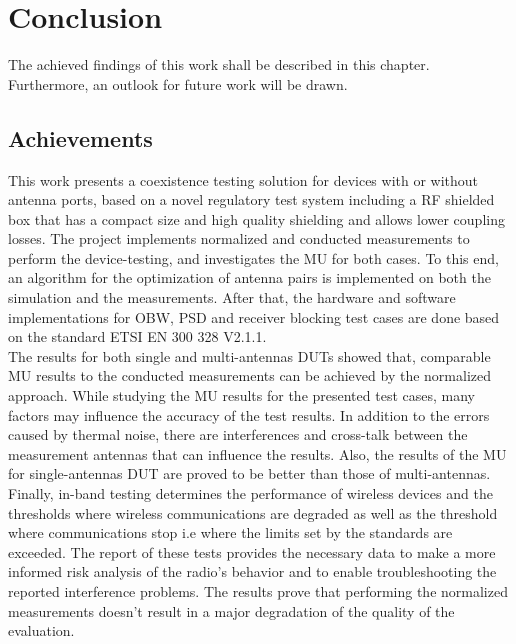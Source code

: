 \chapter{Conclusion} \label{chap:8}

The achieved findings of this work shall be described in this chapter. Furthermore, an outlook for future work will be drawn.

\section{Achievements}
This work presents a coexistence testing solution for devices with or without antenna ports, based on a novel regulatory test system including a \acs{RF} shielded box that has a compact size and high quality shielding and allows lower coupling losses. The project implements normalized and conducted measurements to perform the device-testing, and investigates the \acf{MU} for both cases. To this end, an algorithm for the optimization of antenna pairs is implemented on both the simulation and the measurements. After that, the hardware and software implementations for \acf{OBW}, \acf{PSD} and receiver blocking test cases are done based on the standard ETSI EN 300 328 V2.1.1. \\

 The results for both single and multi-antennas \acsp{DUT} showed that, comparable \acf{MU} results to the conducted measurements can be achieved by the normalized approach. While studying the \acf{MU} results for the presented test cases, many factors may influence the accuracy of the test results. In addition to the errors caused by thermal noise, there are interferences and cross-talk between the measurement antennas that can influence the results. Also, the results of the \acf{MU} for single-antennas \acs{DUT} are proved to be better than those of multi-antennas. \\
 
 Finally, in-band testing determines the performance of wireless devices and the thresholds where wireless communications are degraded as well as the threshold where communications stop i.e where the limits set by the standards are exceeded. The report of these tests provides the necessary data to make a more informed risk analysis of the radio's behavior and to enable troubleshooting the reported interference problems. The results prove that performing the normalized measurements doesn't result in a major degradation of the quality of the evaluation.


